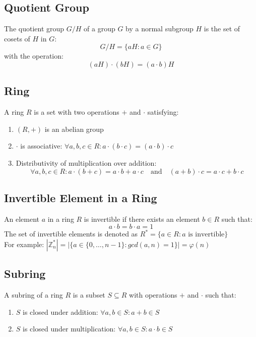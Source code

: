 \documentclass{article}
\begin{document}
\subsection{Quotient Group}

The quotient group \( G/H \) of a group \( G \) by a normal subgroup \( H \) is the set of cosets of \( H \) in \( G \):
\[
G/H = \{aH : a\in G\}
\]
with the operation:
\[ (aH) \cdot (bH) = (a \cdot b)H \]

\subsection{Ring}

A ring \( R \) is a set with two operations \( + \) and \( \cdot \) satisfying:
\begin{enumerate}
    \item \( (R, +) \) is an abelian group
    \item \( \cdot \) is associative: \( \forall a, b, c \in R: a \cdot (b \cdot c) = (a \cdot b) \cdot c \)
    \item Distributivity of multiplication over addition:
    \[ \forall a, b, c \in R: a \cdot (b + c) = a \cdot b + a \cdot c \quad \text{and} \quad (a + b) \cdot c = a \cdot c + b \cdot c \]
\end{enumerate}

\subsection{Invertible Element in a Ring}

An element \( a \) in a ring \( R \) is invertible if there exists an element \( b \in R \) such that:
\[ a \cdot b = b \cdot a = 1 \]
The set of invertible elements is denoted as \( R^* = \{ a \in R : a \text{ is invertible} \} \)\\
For example: \(|\mathbb{Z}_n^{*}| = |\{a\in\{0,\dots,n-1\}: gcd(a,n)=1 \}| = \varphi(n)\)

\subsection{Subring}

A subring of a ring \( R \) is a subset \( S \subseteq R \) with operations \( + \) and \( \cdot \) such that:
\begin{enumerate}
    \item \( S \) is closed under addition: \( \forall a, b \in S: a + b \in S \)
    \item \( S \) is closed under multiplication: \( \forall a, b \in S: a \cdot b \in S \)
\end{enumerate}
\end{document}
